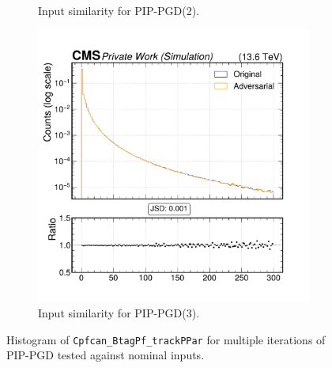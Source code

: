 \begin{figure}[htbp]
\begin{subfigure}[t]{0.32\textwidth}
    \caption*{Input similarity for PIP-PGD(2).}
  \end{subfigure}\hfill
  \begin{subfigure}[t]{0.32\textwidth}
    \includegraphics[width=\linewidth]{media/output/features/compare/combined_it_3/cmp_cpf_arr_Cpfcan_BtagPf_trackPPar.pdf}
    \caption*{Input similarity for PIP-PGD(3).}
  \end{subfigure}

  \caption*{Histogram of \texttt{Cpfcan\_BtagPf\_trackPPar} for multiple iterations of PIP-PGD tested against nominal inputs.}
  \label{fig:combined_input_Cpfcan_BtagPf_trackPPar}
\end{figure}

